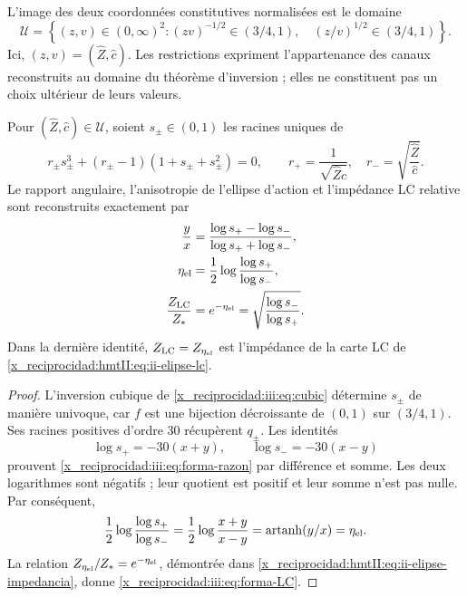 L’image des deux coordonnées constitutives normalisées est le domaine
\begin{equation}
 \mathcal U=\left\{(z,v)\in(0,\infty)^2:
   (zv)^{-1/2}\in(3/4,1),\quad
   (z/v)^{1/2}\in(3/4,1)\right\}.
 \label{x_reciprocidad:iii:eq:forma-dominio}
\end{equation}
Ici, $(z,v)=(\widehat Z,\widehat c)$. Les restrictions expriment l'appartenance des canaux reconstruits au domaine du théorème d'inversion ; elles ne constituent pas un choix ultérieur de leurs valeurs.

\begin{proposition}
\label{x_reciprocidad:iii:prop:forma-LC}
Pour $(\widehat Z,\widehat c)\in\mathcal U$, soient $s_\pm\in(0,1)$ les
racines uniques de
\begin{equation}
 r_\pm s_\pm^3+(r_\pm-1)(1+s_\pm+s_\pm^2)=0,
 \qquad
 r_+=\frac1{\sqrt{\widehat Z\widehat c}},\quad
 r_-=\sqrt{\frac{\widehat Z}{\widehat c}}.
 \label{x_reciprocidad:iii:eq:forma-inversion}
\end{equation}
Le rapport angulaire, l’anisotropie de l’ellipse d’action et l’impédance
LC relative sont reconstruits exactement par
\begin{align}
 \frac{y}{x}
 &=\frac{\log s_+-\log s_-}{\log s_++\log s_-},
 \label{x_reciprocidad:iii:eq:forma-razon}\\
 \eta_{\rm el}
 &=\frac12\log\frac{\log s_+}{\log s_-},
 \label{x_reciprocidad:iii:eq:forma-eta}\\
 \frac{Z_{\rm LC}}{Z_*}
 &=e^{-\eta_{\rm el}}
  =\sqrt{\frac{\log s_-}{\log s_+}}.
 \label{x_reciprocidad:iii:eq:forma-LC}
\end{align}
Dans la dernière identité, $Z_{\rm LC}=Z_{\eta_{\rm el}}$ est l’impédance
de la carte LC de \eqref{x_reciprocidad:hmtII:eq:ii-elipse-lc}.
\end{proposition}
\begin{proof}
L'inversion cubique de \eqref{x_reciprocidad:iii:eq:cubic} détermine $s_\pm$ de manière univoque, car $f$ est une bijection décroissante de $(0,1)$ sur $(3/4,1)$. Ses racines positives d'ordre $30$ récupèrent $q_\pm$. Les identités
\[
 \log s_+=-30(x+y),\qquad \log s_-=-30(x-y)
\]
prouvent \eqref{x_reciprocidad:iii:eq:forma-razon} par différence et somme. Les deux logarithmes
sont négatifs ; leur quotient est positif et leur somme n’est pas nulle. Par conséquent,
\[
 \frac12\log\frac{\log s_+}{\log s_-}
   =\frac12\log\frac{x+y}{x-y}
   =\operatorname{artanh}(y/x)=\eta_{\rm el}.
\]
La relation $Z_{\eta_{\rm el}}/Z_*=e^{-\eta_{\rm el}}$, démontrée dans
\eqref{x_reciprocidad:hmtII:eq:ii-elipse-impedancia}, donne \eqref{x_reciprocidad:iii:eq:forma-LC}.
\end{proof}

